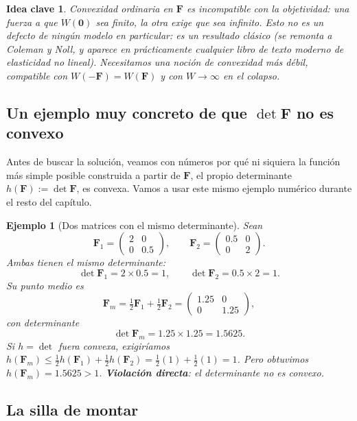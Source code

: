 \documentclass[11pt,a4paper]{article}
\newtheorem{takeaway}{Idea clave}
\newtheorem{ejemplo}{Ejemplo}
\begin{document}
\begin{takeaway}
Convexidad ordinaria en $\bm F$ es incompatible con la objetividad:
una fuerza a que $W(\bm 0)$ sea finito, la otra exige que sea infinito.
Esto no es un defecto de ning\'un modelo en particular: es un
resultado cl\'asico (se remonta a Coleman y Noll, y aparece en
pr\'acticamente cualquier libro de texto moderno de elasticidad no
lineal). Necesitamos una noci\'on de convexidad m\'as d\'ebil,
compatible con $W(-\bm F)=W(\bm F)$ y con $W\to\infty$ en el colapso.
\end{takeaway}

\subsection{Un ejemplo muy concreto de que $\det\bm F$ no es convexo}

Antes de buscar la soluci\'on, veamos con n\'umeros por qu\'e ni
siquiera la funci\'on m\'as simple posible construida a partir de
$\bm F$, el propio determinante $h(\bm F):=\det\bm F$, es convexa.
Vamos a usar este mismo ejemplo num\'erico durante el resto del
cap\'itulo.

\begin{ejemplo}[Dos matrices con el mismo determinante]
\label{ex:appB-F1F2}
Sean
\[
 \bm F_1=\begin{pmatrix}2&0\\0&0.5\end{pmatrix},\qquad
 \bm F_2=\begin{pmatrix}0.5&0\\0&2\end{pmatrix}.
\]
Ambas tienen el mismo determinante:
\[
 \det\bm F_1=2\times0.5=1,\qquad \det\bm F_2=0.5\times2=1.
\]
Su punto medio es
\[
 \bm F_m=\tfrac12\bm F_1+\tfrac12\bm F_2
 =\begin{pmatrix}1.25&0\\0&1.25\end{pmatrix},
\]
con determinante
\[
 \det\bm F_m=1.25\times1.25=1.5625.
\]
Si $h=\det$ fuera convexa, exigir\'iamos
$h(\bm F_m)\leq\tfrac12h(\bm F_1)+\tfrac12h(\bm F_2)=\tfrac12(1)+\tfrac12(1)=1$.
Pero obtuvimos $h(\bm F_m)=1.5625>1$. \textbf{Violaci\'on directa}: el
determinante no es convexo.
\end{ejemplo}

\subsection{La silla de montar}
\end{document}
